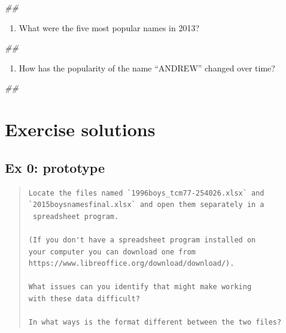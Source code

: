 \documentclass[]{book}
\newenvironment{Shaded}{\begin{snugshade}}{\end{snugshade}}
\newcommand{\CommentTok}[1]{\textcolor[rgb]{0.56,0.35,0.01}{\textit{#1}}}
\providecommand{\tightlist}{%
  \setlength{\itemsep}{0pt}\setlength{\parskip}{0pt}}
\begin{document}
\begin{Shaded}
\begin{Highlighting}[]
\CommentTok{## }
\end{Highlighting}
\end{Shaded}

\begin{enumerate}
\def\labelenumi{\arabic{enumi}.}
\setcounter{enumi}{2}
\tightlist
\item
  What were the five most popular names in 2013?
\end{enumerate}

\begin{Shaded}
\begin{Highlighting}[]
\CommentTok{## }
\end{Highlighting}
\end{Shaded}

\begin{enumerate}
\def\labelenumi{\arabic{enumi}.}
\setcounter{enumi}{3}
\tightlist
\item
  How has the popularity of the name ``ANDREW'' changed over time?
\end{enumerate}

\begin{Shaded}
\begin{Highlighting}[]
\CommentTok{## }
\end{Highlighting}
\end{Shaded}

\hypertarget{exercise-solutions-3}{%
\section{Exercise solutions}\label{exercise-solutions-3}}

\hypertarget{ex-0-prototype-3}{%
\subsection{Ex 0: prototype}\label{ex-0-prototype-3}}

\begin{quote}
\begin{verbatim}
Locate the files named `1996boys_tcm77-254026.xlsx` and 
`2015boysnamesfinal.xlsx` and open them separately in a 
 spreadsheet program. 

(If you don't have a spreadsheet program installed on
your computer you can download one from
https://www.libreoffice.org/download/download/). 

What issues can you identify that might make working
with these data difficult?

In what ways is the format different between the two files?
\end{verbatim}
\end{quote}
\end{document}
